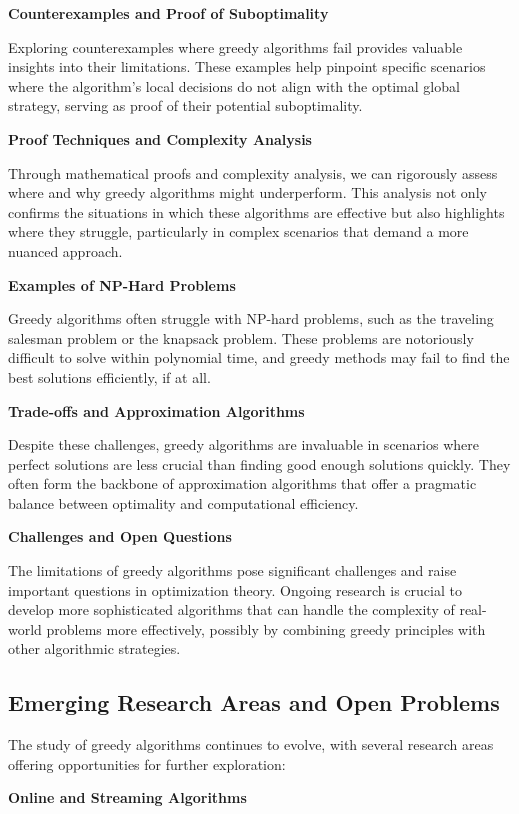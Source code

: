 \documentclass[12pt]{book} %
\begin{document}
\textbf{Counterexamples and Proof of Suboptimality}

Exploring counterexamples where greedy algorithms fail provides valuable insights into their limitations. These examples help pinpoint specific scenarios where the algorithm's local decisions do not align with the optimal global strategy, serving as proof of their potential suboptimality.

\textbf{Proof Techniques and Complexity Analysis}

Through mathematical proofs and complexity analysis, we can rigorously assess where and why greedy algorithms might underperform. This analysis not only confirms the situations in which these algorithms are effective but also highlights where they struggle, particularly in complex scenarios that demand a more nuanced approach.

\textbf{Examples of NP-Hard Problems}

Greedy algorithms often struggle with NP-hard problems, such as the traveling salesman problem or the knapsack problem. These problems are notoriously difficult to solve within polynomial time, and greedy methods may fail to find the best solutions efficiently, if at all.

\textbf{Trade-offs and Approximation Algorithms}

Despite these challenges, greedy algorithms are invaluable in scenarios where perfect solutions are less crucial than finding good enough solutions quickly. They often form the backbone of approximation algorithms that offer a pragmatic balance between optimality and computational efficiency.

\textbf{Challenges and Open Questions}

The limitations of greedy algorithms pose significant challenges and raise important questions in optimization theory. Ongoing research is crucial to develop more sophisticated algorithms that can handle the complexity of real-world problems more effectively, possibly by combining greedy principles with other algorithmic strategies.

\subsection{Emerging Research Areas and Open Problems}

The study of greedy algorithms continues to evolve, with several research areas offering opportunities for further exploration:

\textbf{Online and Streaming Algorithms}
\end{document}
